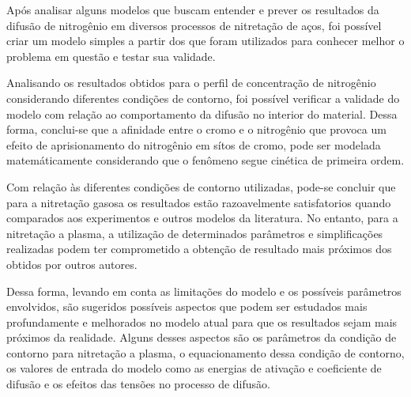 Após analisar alguns modelos que buscam entender e prever os resultados da difusão de nitrogênio em diversos processos de nitretação de aços, foi possível criar um modelo simples a partir dos que foram utilizados para conhecer melhor o problema em questão e testar sua validade.

Analisando os resultados obtidos para o perfil de concentração de nitrogênio considerando diferentes condições de contorno, foi possível verificar a validade do modelo com relação ao comportamento da difusão no interior do material. Dessa forma, conclui-se que a afinidade entre o cromo e o nitrogênio que provoca um efeito de aprisionamento do nitrogênio em sítos de cromo, pode ser modelada matemáticamente considerando que o fenômeno segue cinética de primeira ordem.

Com relação às diferentes condições de contorno utilizadas, pode-se concluir que para a nitretação gasosa os resultados estão razoavelmente satisfatorios quando comparados aos experimentos e outros modelos da literatura. No entanto, para a nitretação a plasma, a utilização de determinados parâmetros e simplificações realizadas podem ter comprometido a obtenção de resultado mais próximos dos obtidos por outros autores. 

Dessa forma, levando em conta as limitações do modelo e os possíveis parâmetros envolvidos, são sugeridos possíveis aspectos que podem ser estudados mais profundamente e melhorados no modelo atual para que os resultados sejam mais próximos da realidade. Alguns desses aspectos são os parâmetros da condição de contorno para nitretação a plasma, o equacionamento dessa condição de contorno, os valores de entrada do modelo como as energias de ativação e coeficiente de difusão e os efeitos das tensões no processo de difusão.